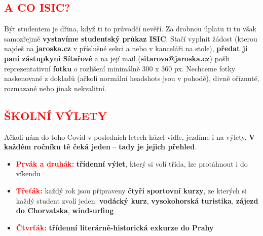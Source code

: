 \documentclass{article}
\newcommand{\podnadpis}[1]{
  \subsection*{\textcolor{red}{#1}}
}
\begin{document}
\podnadpis{A CO ISIC?}
Být studentem je dřina, když ti to průvodčí nevěří. Za drobnou úplatu ti tu však samozřejmě \textbf{vystavíme studentský průkaz ISIC}. Stačí vyplnit žádost (kterou najdeš na {\bf jaroska.cz} v příslušné sekci a nebo v kanceláři na stole), \textbf{předat ji paní zástupkyni Sítařové} a na její mail (\textbf{sitarova@jaroska.cz}) pošli reprezentativní \textbf{fotku} o rozlišení minimálně 300 x 360 px. Nechceme fotky naskenované z dokladů (ačkoli normální headshots jsou v pohodě), divně oříznuté, rozmazané nebo jinak
nekvalitní.

\newpage

\podnadpis{ŠKOLNÍ VÝLETY}
Ačkoli nám do toho Covid v posledních letech házel vidle, jezdíme i na výlety.
\textbf{V každém ročníku tě čeká jeden} -- \textbf{tady je jejich přehled}.

\begin{itemize}[leftmargin=10pt]
  \item \textcolor{red}{\textbf{Prvák a druhák:}} \textbf{třídenní výlet}, který si volí třída, lze protáhnout i do víkendu
  \item \textcolor{red}{\textbf{Třeťák:}} každý rok jsou připraveny \textbf{čtyři sportovní kurzy}, ze kterých si každý student zvolí jeden: \textbf{vodácký kurz}, \textbf{vysokohorská turistika}, \textbf{zájezd do Chorvatska}, \textbf{windsurfing}
  \item \textcolor{red}{\textbf{Čtvrťák:}} \textbf{třídenní literárně-historická exkurze do Prahy}
\end{itemize}
\end{document}
